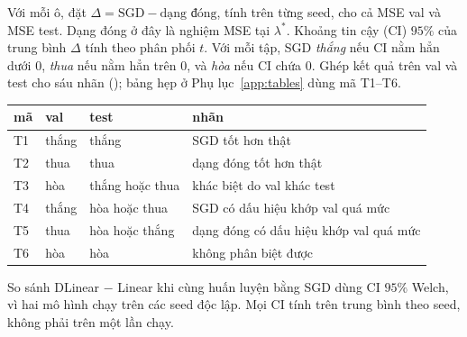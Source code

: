 Với mỗi ô, đặt $\Delta = \text{SGD} - \text{dạng đóng}$, tính trên từng seed, cho cả MSE val và MSE test. Dạng đóng ở đây là nghiệm MSE tại $\lambda^*$. Khoảng tin cậy (CI) $95\%$ của trung bình $\Delta$ tính theo phân phối $t$. Với mỗi tập, SGD \emph{thắng} nếu CI nằm hẳn dưới $0$, \emph{thua} nếu nằm hẳn trên $0$, và \emph{hòa} nếu CI chứa $0$. Ghép kết quả trên val và test cho sáu nhãn (); bảng hẹp ở Phụ lục~\ref{app:tables} dùng mã T1--T6.

\begin{captionbelowboxaivn}
\label{tab:rule}
\end{captionbelowboxaivn}
\begin{center}
\begin{tabular}{@{}llll@{}}
\toprule
mã & val & test & nhãn \\
\midrule
T1 & thắng & thắng & SGD tốt hơn thật \\
T2 & thua & thua & dạng đóng tốt hơn thật \\
T3 & hòa & thắng hoặc thua & khác biệt do val khác test \\
T4 & thắng & hòa hoặc thua & SGD có dấu hiệu khớp val quá mức \\
T5 & thua & hòa hoặc thắng & dạng đóng có dấu hiệu khớp val quá mức \\
T6 & hòa & hòa & không phân biệt được \\
\bottomrule
\end{tabular}
\end{center}

So sánh DLinear $-$ Linear khi cùng huấn luyện bằng SGD dùng CI $95\%$ Welch, vì hai mô hình chạy trên các seed độc lập. Mọi CI tính trên trung bình theo seed, không phải trên một lần chạy.
